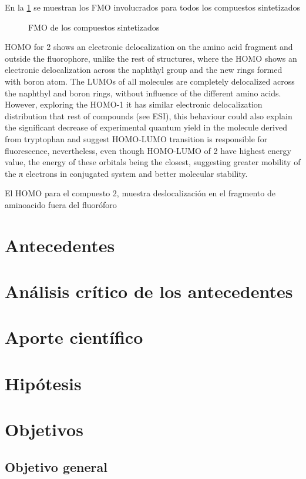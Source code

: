 \documentclass[spanish,mexico]{scrartcl}
\begin{document}
En la \cref{fig:FMO} se muestran los \gls{FMO} involucrados para todos los compuestos sintetizados

\begin{figure}
    \centering
    \label{fig:FMO}
    \caption{\gls{FMO} de los compuestos sintetizados}
\end{figure}

HOMO for 2 shows an electronic delocalization on the amino acid fragment and outside the fluorophore, unlike the rest of structures, where the HOMO shows an electronic delocalization across the naphthyl group and the new rings formed with boron atom. The LUMOs of all molecules are completely delocalized across the naphthyl and boron rings, without influence of the different amino acids. However, exploring the HOMO-1 it has similar electronic delocalization distribution that rest of compounds (see ESI), this behaviour could also explain the significant decrease of experimental quantum yield in the molecule derived from tryptophan and suggest HOMO-LUMO transition is responsible for fluorescence, nevertheless, even though HOMO-LUMO of 2 have highest energy value, the energy of these orbitals being the closest, suggesting greater mobility of the π electrons in conjugated system and better molecular stability.

El \gls{HOMO} para el compuesto 2, muestra deslocalización en el fragmento de aminoacido fuera del fluoróforo 

\section{Antecedentes}
\section{Análisis crítico de los antecedentes}
\section{Aporte científico}
\section{Hipótesis}
\section{Objetivos}
\subsection{Objetivo general}
\end{document}
